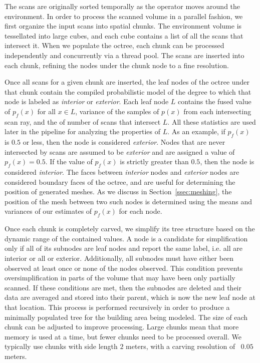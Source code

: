 \documentclass[review]{acmsiggraph}
\begin{document}

The scans are originally sorted temporally as the operator moves around the environment.  In order to process the scanned volume in a parallel fashion, we first organize the input scans into spatial chunks.  The environment volume is tessellated into large cubes, and each cube contains a list of all the scans that intersect it.  When we populate the octree, each chunk can be processed independently and concurrently via a thread pool.  The scans are inserted into each chunk, refining the nodes under the chunk node to a fine resolution.  

Once all scans for a given chunk are inserted, the leaf nodes of the octree under that chunk contain the compiled probabilistic model of the degree to which that node is labeled as {\it interior} or {\it exterior}.  Each leaf node $L$ contains the fused value of $p_f(x)$ for all $x \in L$, variance of the samples of $p(x)$ from each intersecting scan ray, and the of number of scans that intersect $L$.  All these statistics are used later in the pipeline for analyzing the properties of $L$.  As an example, if $p_f(x)$ is $0.5$ or less, then the node is considered {\it exterior}.  Nodes that are never intersected by scans are assumed to be {\it exterior} and are assigned a value of $p_f(x)=0.5$.  If the value of $p_f(x)$ is strictly greater than $0.5$, then the node is considered {\it interior}.  The faces between {\it interior} nodes and {\it exterior} nodes are considered boundary faces of the octree, and are useful for determining the position of generated meshes.  As we discuss in Section~\ref{ssec:meshing}, the position of the mesh between two such nodes is determined using the means and variances of our estimates of $p_f(x)$ for each node.

Once each chunk is completely carved, we simplify its tree structure based on the dynamic range of the contained values.  A node is a candidate for simplification only if all of its subnodes are leaf nodes and report the same label, i.e. all are interior or all or exterior.  Additionally, all subnodes must have either been observed at least once or none of the nodes observed.  This condition prevents oversimplification in parts of the volume that may have been only partially scanned.  If these conditions are met, then the subnodes are deleted and their data are averaged and stored into their parent, which is now the new leaf node at that location.  This process is performed recursively in order to produce a minimally populated tree for the building area being modeled.  The size of each chunk can be adjusted to improve processing.  Large chunks mean that more memory is used at a time, but fewer chunks need to be processed overall.  We typically use chunks with side length $2$ meters, with a carving resolution of ~$0.05$ meters.
\end{document}
